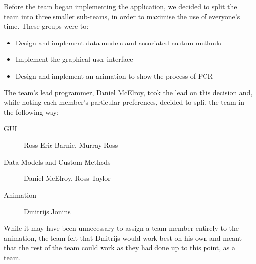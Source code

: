 Before the team began implementing the application, we decided to
split the team into three smaller sub-teams, in order to maximise the
use of everyone's time.
These groups were to:
\begin{itemize}
\item Design and implement data models and associated custom methods
\item Implement the graphical user interface
\item Design and implement an animation to show the process of PCR
\end{itemize}

The team's lead programmer, Daniel McElroy, took the lead on this
decision and, while noting each member's particular preferences,
decided to split the team in the following way:
\begin{description}
\item[GUI]{Ross Eric Barnie, Murray Ross}
\item[Data Models and Custom Methods] {Daniel McElroy, Ross Taylor}
\item[Animation] {Dmitrijs Jonins}
\end{description}

While it may have been unnecessary to assign a team-member entirely to
the animation, the team felt that Dmitrijs would work best on his own
and meant that the rest of the team could work as they had done up to
this point, as a team.
